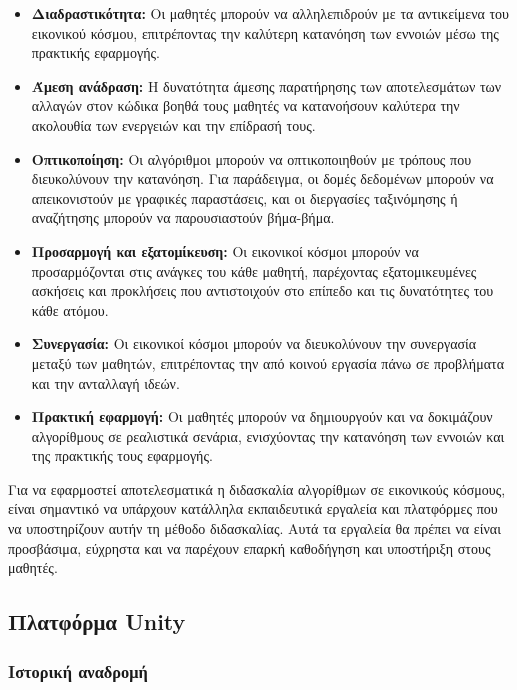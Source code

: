 \begin{itemize}
    \item \textbf{Διαδραστικότητα:} Οι μαθητές μπορούν να αλληλεπιδρούν με τα αντικείμενα του εικονικού κόσμου, επιτρέποντας την καλύτερη κατανόηση των εννοιών μέσω της πρακτικής εφαρμογής.
    \item \textbf{Άμεση ανάδραση:} Η δυνατότητα άμεσης παρατήρησης των αποτελεσμάτων των αλλαγών στον κώδικα βοηθά τους μαθητές να κατανοήσουν καλύτερα την ακολουθία των ενεργειών και την επίδρασή τους.
    \item \textbf{Οπτικοποίηση:} Οι αλγόριθμοι μπορούν να οπτικοποιηθούν με τρόπους που διευκολύνουν την κατανόηση. Για παράδειγμα, οι δομές δεδομένων μπορούν να απεικονιστούν με γραφικές παραστάσεις, και οι διεργασίες ταξινόμησης ή αναζήτησης μπορούν να παρουσιαστούν βήμα-βήμα.
    \item \textbf{Προσαρμογή και εξατομίκευση:} Οι εικονικοί κόσμοι μπορούν να προσαρμόζονται στις ανάγκες του κάθε μαθητή, παρέχοντας εξατομικευμένες ασκήσεις και προκλήσεις που αντιστοιχούν στο επίπεδο και τις δυνατότητες του κάθε ατόμου.
    \item \textbf{Συνεργασία:} Οι εικονικοί κόσμοι μπορούν να διευκολύνουν την συνεργασία μεταξύ των μαθητών, επιτρέποντας την από κοινού εργασία πάνω σε προβλήματα και την ανταλλαγή ιδεών.
    \item \textbf{Πρακτική εφαρμογή:} Οι μαθητές μπορούν να δημιουργούν και να δοκιμάζουν αλγορίθμους σε ρεαλιστικά σενάρια, ενισχύοντας την κατανόηση των εννοιών και της πρακτικής τους εφαρμογής\cite{damasevicius_virtual_2024,rossiou_using_2009}.
\end{itemize}

Για να εφαρμοστεί αποτελεσματικά η διδασκαλία αλγορίθμων σε εικονικούς κόσμους, είναι σημαντικό να υπάρχουν κατάλληλα εκπαιδευτικά εργαλεία και πλατφόρμες που να υποστηρίζουν αυτήν τη μέθοδο διδασκαλίας. Αυτά τα εργαλεία θα πρέπει να είναι προσβάσιμα, εύχρηστα και να παρέχουν επαρκή καθοδήγηση και υποστήριξη στους μαθητές.


\subsection{Πλατφόρμα Unity}

\subsubsection{Ιστορική αναδρομή}


